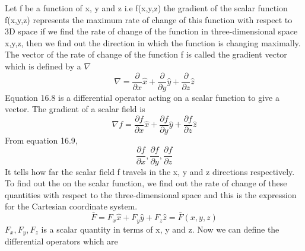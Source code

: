 Let f be a function of x, y and z i.e f(x,y,z) the gradient of the scalar function f(x,y,z) represents the maximum rate of change of this function with respect to 3D space if we find the rate of change of the function in three-dimensional space x,y,z, then we find out the direction in which the function is changing maximally. The vector of the rate of change of the function f is called the gradient vector which is defined by a  $\nabla$
\begin{equation}
\nabla = \frac{\partial}{\partial x}\hat{x} + \frac{\partial}{\partial y}\hat{y} + \frac{\partial}{\partial z}\hat{z}
\end{equation} 
Equation 16.8 is a differential operator acting on a scalar function to give a vector. The gradient of a scalar field is 
\begin{equation}
\nabla f = \frac{\partial f}{\partial x}\hat{x} + \frac{\partial f}{\partial y}\hat{y} + \frac{\partial f}{\partial z}\hat{z}
\end{equation} 
From equation 16.9,
\begin{equation*}
\frac{\partial f}{\partial x}, \frac{\partial f}{\partial y}, \frac{\partial f}{\partial z}
\end{equation*}
It tells how far the scalar field f travels in the x, y and z directions respectively. To find out the  on the scalar function, we find out the rate of change of these quantities with respect to the three-dimensional space and this is the expression for the Cartesian coordinate system.
\begin{equation}
\bar{F}  =  F_{x}\hat{x} + F_{y}\hat{y} + F_{z}\hat{z}  =   \bar{F}(x,y,z)
\end{equation}
$F_{x}, F_{y}, F_{z}$ is a scalar quantity in terms of x, y and z. Now we can define the differential operators which are
